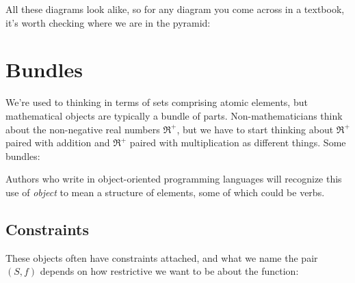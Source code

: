 \documentclass[11pt]{article}
\begin{document}
All these diagrams look alike, so for any diagram you come across in a textbook, it's
worth checking where we are in the pyramid:

\section{Bundles}\label{bundlesec}
We're used to thinking in terms of sets comprising atomic elements, but mathematical
objects are typically a bundle of parts. Non-mathematicians think about the non-negative real numbers
$\Re^+$, but we have to start thinking about $\Re^+$ paired with addition and $\Re^+$
paired with multiplication as different things. Some bundles:


Authors who write in object-oriented programming languages will recognize this
use of {\em object} to mean a structure of elements, some of which could be verbs.

\subsection{Constraints}
These objects often have constraints attached, and what we name the pair $(S, f)$ depends on
how restrictive we want to be about the function:
\end{document}
